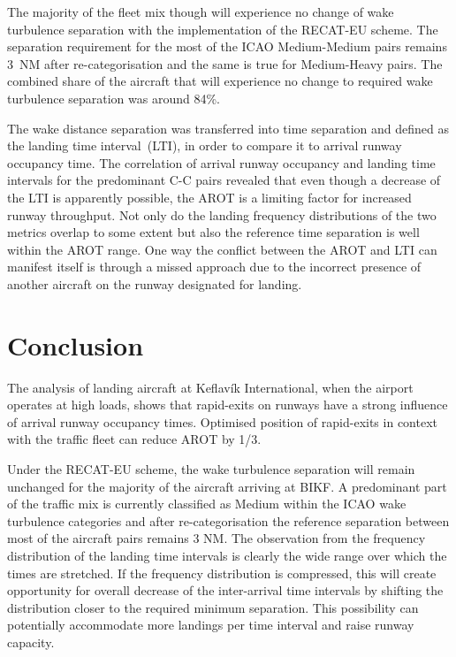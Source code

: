 The majority of the fleet mix though will experience no change of wake turbulence separation with the implementation of the RECAT-EU scheme. The separation requirement for the most of the ICAO Medium-Medium pairs remains 3~NM after re-categorisation and the same is true for Medium-Heavy pairs. The combined share of the aircraft that will experience no change to required wake turbulence separation was around 84\%. 

The wake distance separation was transferred into time separation and defined as the landing time interval~(LTI), in order to compare it to arrival runway occupancy time.
The correlation of arrival runway occupancy and landing time intervals for the predominant C-C pairs revealed that even though a decrease of the LTI is apparently possible, the AROT is a limiting factor for increased runway throughput. Not only do the landing frequency distributions of the two metrics overlap to some extent but also the reference time separation is well within the AROT range. One way the conflict between the AROT and LTI can manifest itself is through a missed approach due to the incorrect presence of another aircraft on the runway designated for landing.

\chapter{Conclusion\label{cha:conclusions}}
The analysis of landing aircraft at Keflavík International, when the airport operates at high loads, shows that rapid-exits on runways have a strong influence of arrival runway occupancy times. Optimised position of rapid-exits in context with the traffic fleet can reduce AROT by 1/3.%

Under the RECAT-EU scheme, the wake turbulence separation will remain unchanged for the majority of the aircraft arriving at BIKF. A predominant part of the traffic mix is currently classified as Medium within the ICAO wake turbulence categories and after re-categorisation the reference separation between most of the aircraft pairs remains 3 NM. The observation from the frequency distribution of the landing time intervals is clearly the wide range over which the times are stretched. If the frequency distribution is compressed, this will create opportunity for overall decrease of the inter-arrival time intervals by shifting the distribution closer to the required minimum separation. This possibility can potentially accommodate more landings per time interval and raise runway capacity.

